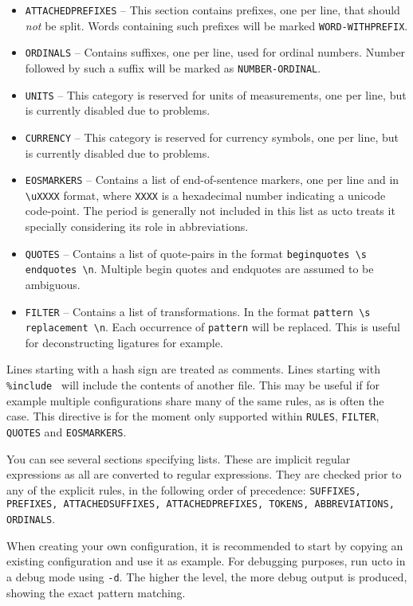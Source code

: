 \documentclass[a4paper,12pt]{report}
\begin{document}
\begin{itemize}
\item \texttt{ATTACHEDPREFIXES} -- This section contains prefixes, one per line, that should \emph{not} be split. Words containing such prefixes will be marked \texttt{WORD-WITHPREFIX}.
\item \texttt{ORDINALS} -- Contains suffixes, one per line, used for ordinal numbers. Number followed by such a suffix will be marked as \texttt{NUMBER-ORDINAL}.
\item \texttt{UNITS} -- This category is reserved for units of measurements, one per line, but is currently disabled due to problems.
\item \texttt{CURRENCY} -- This category is reserved for currency symbols, one per line, but is currently disabled due to problems.
\item \texttt{EOSMARKERS} -- Contains a list of end-of-sentence markers, one per line and in \texttt{{\textbackslash}uXXXX} format, where \texttt{XXXX} is a hexadecimal number indicating a unicode code-point. The period is generally not included in this list as ucto treats it specially considering its role in abbreviations.
\item \texttt{QUOTES} -- Contains a list of quote-pairs in the format \texttt{beginquotes {\textbackslash}s endquotes {\textbackslash}n}. Multiple begin quotes and endquotes are assumed to be ambiguous.
\item \texttt{FILTER} -- Contains a list of transformations. In the format \texttt{pattern {\textbackslash}s replacement {\textbackslash}n}. Each occurrence of \texttt{pattern} will be replaced. This is useful for deconstructing ligatures for example.
\end{itemize}

Lines starting with a hash sign are treated as comments. Lines starting with \texttt{\%include } will include the contents of another file. This may be useful if for example multiple configurations share many of the same rules, as is often the case.  This directive is for the moment only supported within \texttt{RULES}, \texttt{FILTER}, \texttt{QUOTES} and \texttt{EOSMARKERS}.

You can see several sections specifying lists. These are implicit regular expressions as all are converted to regular expressions. They are checked prior to any of the explicit rules, in the following order of precedence: \texttt{SUFFIXES, PREFIXES, ATTACHEDSUFFIXES, ATTACHEDPREFIXES, TOKENS, ABBREVIATIONS, ORDINALS}.

When creating your own configuration, it is recommended to start by copying an existing configuration and use it as example. For debugging purposes, run ucto in a debug mode using \texttt{-d}. The higher the level, the more debug output is produced, showing the exact pattern matching.
\end{document}

